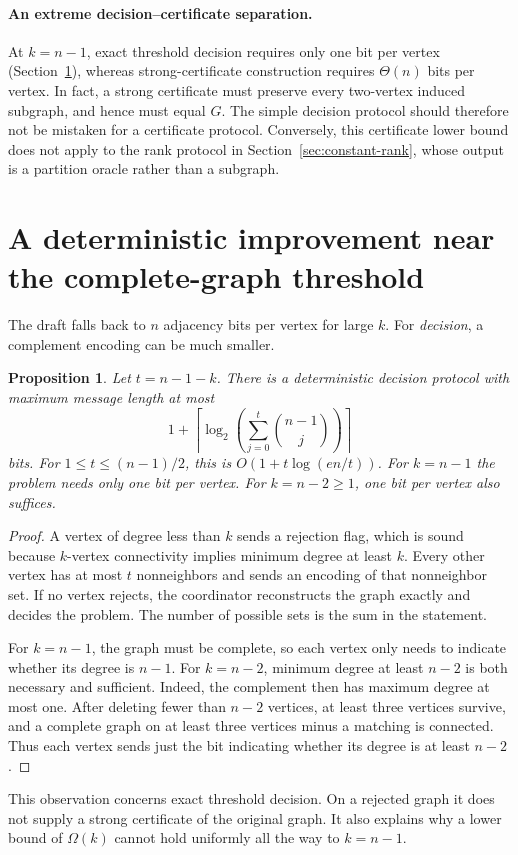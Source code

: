 \documentclass[11pt]{article}
\newtheorem{proposition}[theorem]{Proposition}
\theoremstyle{remark}\newtheorem{remark}[theorem]{Remark}
\begin{document}
\paragraph{An extreme decision--certificate separation.}
At $k=n-1$, exact threshold decision requires only one bit per vertex (Section~\ref{sec:near-complete}), whereas strong-certificate construction requires $\Theta(n)$ bits per vertex. In fact, a strong certificate must preserve every two-vertex induced subgraph, and hence must equal $G$. The simple decision protocol should therefore not be mistaken for a certificate protocol. Conversely, this certificate lower bound does not apply to the rank protocol in Section~\ref{sec:constant-rank}, whose output is a partition oracle rather than a subgraph.

\section{A deterministic improvement near the complete-graph threshold}\label{sec:near-complete}
The draft falls back to $n$ adjacency bits per vertex for large $k$. For \emph{decision}, a complement encoding can be much smaller.

\begin{proposition}
Let $t=n-1-k$. There is a deterministic decision protocol with maximum message length at most
\[
 1+\left\lceil\log_2\left(\sum_{j=0}^{t}\binom{n-1}{j}\right)\right\rceil
\]
bits. For $1\le t\le(n-1)/2$, this is $O(1+t\log(en/t))$. For $k=n-1$ the problem needs only one bit per vertex. For $k=n-2\ge1$, one bit per vertex also suffices.
\end{proposition}
\begin{proof}
A vertex of degree less than $k$ sends a rejection flag, which is sound because $k$-vertex connectivity implies minimum degree at least $k$. Every other vertex has at most $t$ nonneighbors and sends an encoding of that nonneighbor set. If no vertex rejects, the coordinator reconstructs the graph exactly and decides the problem. The number of possible sets is the sum in the statement.

For $k=n-1$, the graph must be complete, so each vertex only needs to indicate whether its degree is $n-1$. For $k=n-2$, minimum degree at least $n-2$ is both necessary and sufficient. Indeed, the complement then has maximum degree at most one. After deleting fewer than $n-2$ vertices, at least three vertices survive, and a complete graph on at least three vertices minus a matching is connected. Thus each vertex sends just the bit indicating whether its degree is at least $n-2$.
\end{proof}
This observation concerns exact threshold decision. On a rejected graph it does not supply a strong certificate of the original graph. It also explains why a lower bound of $\Omega(k)$ cannot hold uniformly all the way to $k=n-1$.
\end{document}
